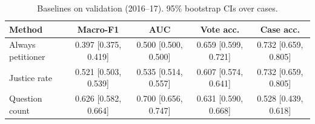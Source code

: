 \begin{table}[h]
  \centering
  \small
  \begin{tabular}{lcccc}
    \toprule
    Method & Macro-F1 & AUC & Vote acc. & Case acc. \\
    \midrule
    Always petitioner & 0.397 [0.375, 0.419] & 0.500 [0.500, 0.500] & 0.659 [0.599, 0.721] & 0.732 [0.659, 0.805] \\
    Justice rate & 0.521 [0.503, 0.539] & 0.535 [0.514, 0.557] & 0.607 [0.574, 0.641] & 0.732 [0.659, 0.805] \\
    Question count & 0.626 [0.582, 0.664] & 0.700 [0.656, 0.747] & 0.631 [0.590, 0.668] & 0.528 [0.439, 0.618] \\
    \bottomrule
  \end{tabular}
  \caption{Baselines on validation (2016--17). 95\% bootstrap CIs over cases.}
  \label{tab:baselines}
\end{table}